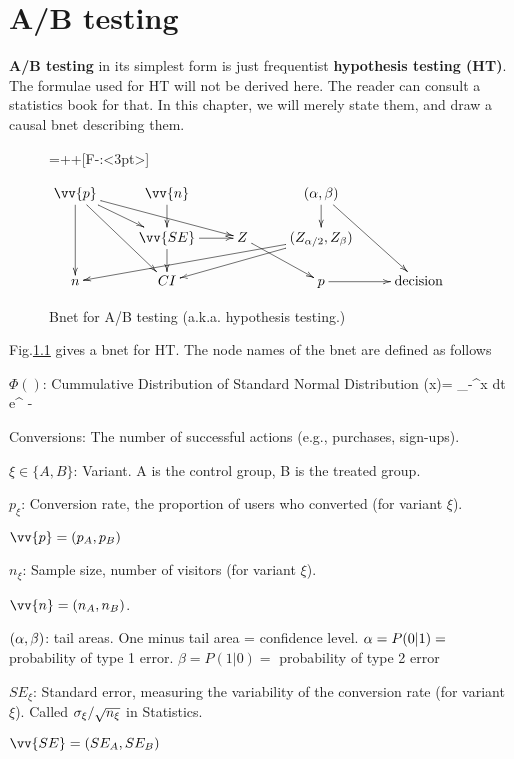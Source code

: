 \chapter{A/B testing}
\label{ch-a-b-testing}

{\bf A/B testing} in its simplest
form is just frequentist {\bf hypothesis testing (HT)}.
The formulae used for HT
will not be  derived here. 
 The reader can consult a statistics book  for that.
In this chapter, we will merely state them,
and draw a causal bnet describing them.


\begin{figure}[h!]

{\entrymodifiers={++[F-:<3pt>]}

$$\xymatrix@R=15pt{
\vv{p}\ar[dd]
\ar[ddr]
\ar[dr]
\ar[drr]
&\vv{n}\ar[d]
&*{}
&(\alp, \beta)\ar[d]
\ar[ddr]
&*{}
&*{}
\\
*{}
&\vv{SE}\ar[d]\ar[r]
&Z\ar[dr]
&(Z_{\alp/2}, Z_\beta)\ar[dlll]
\ar[dll]
&*{}
&*{}
\\
n
&CI
&*{}
&p\ar[r]
&\text{decision}
}$$
}
\caption{Bnet for A/B testing (a.k.a. 
hypothesis testing.)}
\label{fig-bnet-hypo-test}
\end{figure}

Fig.\ref{fig-bnet-hypo-test}
gives a bnet for HT. The node names 
of the bnet are defined as follows

$\Phi()$: Cummulative Distribution
of Standard Normal Distribution
\beq
\Phi (x)=
\int_{-\infty}^x dt\; e^{
-}
\eeq

Conversions: The number of successful actions (e.g., purchases, sign-ups). 

$\xi\in\{A,B\}$: Variant. A is the control group, B is 
the treated group.

$p_\xi$: Conversion rate, the proportion of users who converted (for variant $\xi$).

$\vv{p}=(p_A, p_B)$

$n_\xi$: Sample size, number of visitors
(for variant $\xi$).
   
$\vv{n}=(n_A, n_B)$.

$(\alpha, \beta)$: tail areas. One minus tail area = confidence level. $\alpha=P(0|1)=$ probability of type 1 error. $\beta=P(1|0)=$
probability of type 2 error


$SE_\xi$: Standard error, measuring the variability of the conversion rate
(for variant $\xi$).
Called $\sigma_\xi/\sqrt{n_\xi}$ in Statistics.
    
$\vv{SE}=(SE_A, SE_B)$

